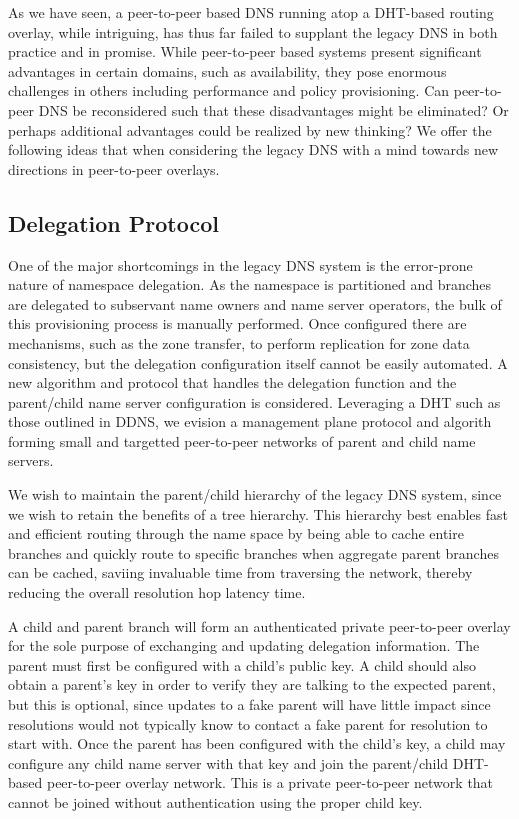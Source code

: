 \documentclass[sigconf]{acmart}
\begin{document}
As we have seen, a peer-to-peer based DNS running atop a DHT-based
routing overlay, while intriguing, has thus far failed to supplant the
legacy DNS in both practice and in promise.  While peer-to-peer based
systems present significant advantages in certain domains, such as
availability, they pose enormous challenges in others including
performance and policy provisioning.  Can peer-to-peer DNS be
reconsidered such that these disadvantages might be eliminated?  Or
perhaps additional advantages could be realized by new thinking?  We
offer the following ideas that when considering the legacy DNS with a
mind towards new directions in peer-to-peer overlays.

\subsection{Delegation Protocol}

One of the major shortcomings in the legacy DNS system is the
error-prone nature of namespace delegation.  As the namespace is
partitioned and branches are delegated to subservant name owners and
name server operators, the bulk of this provisioning process is manually
performed.  Once configured there are mechanisms, such as the zone
transfer, to perform replication for zone data consistency, but the
delegation configuration itself cannot be easily automated.  A new
algorithm and protocol that handles the delegation function and the
parent/child name server configuration is considered.  Leveraging a DHT
such as those outlined in DDNS, we evision a management plane protocol
and algorith forming small and targetted peer-to-peer networks of parent
and child name servers.

We wish to maintain the parent/child hierarchy of the legacy DNS system,
since we wish to retain the benefits of a tree hierarchy.  This
hierarchy best enables fast and efficient routing through the name space
by being able to cache entire branches and quickly route to specific
branches when aggregate parent branches can be cached, saviing
invaluable time from traversing the network, thereby reducing the
overall resolution hop latency time.

A child and parent branch will form an authenticated private
peer-to-peer overlay for the sole purpose of exchanging and updating
delegation information.  The parent must first be configured with a
child's public key.  A child should also obtain a parent's key in order
to verify they are talking to the expected parent, but this is optional,
since updates to a fake parent will have little impact since resolutions
would not typically know to contact a fake parent for resolution to
start with.  Once the parent has been configured with the child's key, a
child may configure any child name server with that key and join the
parent/child DHT-based peer-to-peer overlay network.  This is a private
peer-to-peer network that cannot be joined without authentication using
the proper child key.
\end{document}
